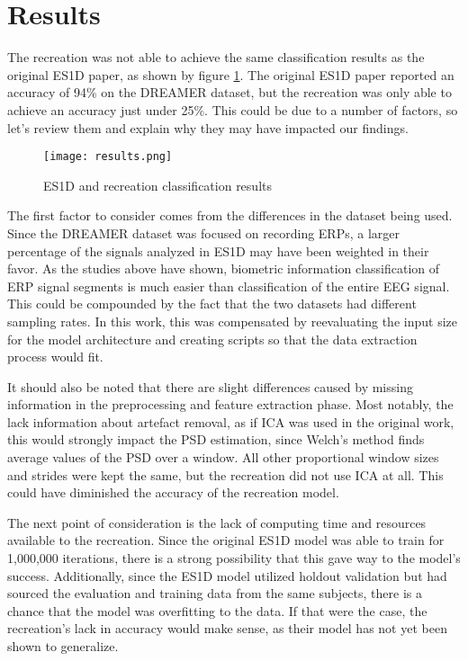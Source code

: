 \section{Results}
The recreation was not able to achieve the same classification results as the original ES1D paper, as shown by figure \ref{fig:results}.
The original ES1D paper reported an accuracy of 94\% on the DREAMER dataset, but the recreation was only able to achieve an accuracy just under 25\%.
This could be due to a number of factors, so let's review them and explain why they may have impacted our findings.

\begin{center}
    \begin{figure}
        \texttt{[image: results.png]}
        \caption{\small{ES1D and recreation classification results}}
        \label{fig:results}
    \end{figure}
\end{center}
The first factor to consider comes from the differences in the dataset being used.
Since the DREAMER dataset was focused on recording ERPs, a larger percentage of the signals analyzed in ES1D may have been weighted in their favor.
As the studies above have shown, biometric information classification of ERP signal segments is much easier than classification of the entire EEG signal\cite{Review,Cerebre,TransformerNetworks,Brainprint,Imagined}.
This could be compounded by the fact that the two datasets had different sampling rates.
In this work, this was compensated by reevaluating the input size for the model architecture and creating scripts so that the data extraction process would fit.

It should also be noted that there are slight differences caused by missing information in the preprocessing and feature extraction phase.
Most notably, the lack information about artefact removal, as if ICA was used in the original work, this would strongly impact the PSD estimation, since Welch's method finds average values of the PSD over a window.
All other proportional window sizes and strides were kept the same, but the recreation did not use ICA at all. This could have diminished the accuracy of the recreation model.

The next point of consideration is the lack of computing time and resources available to the recreation.
Since the original ES1D model was able to train for 1,000,000 iterations, there is a strong possibility that this gave way to the model's success.
Additionally, since the ES1D model utilized holdout validation but had sourced the evaluation and training data from the same subjects, there is a chance that the model was overfitting to the data.
If that were the case, the recreation's lack in accuracy would make sense, as their model has not yet been shown to generalize.

